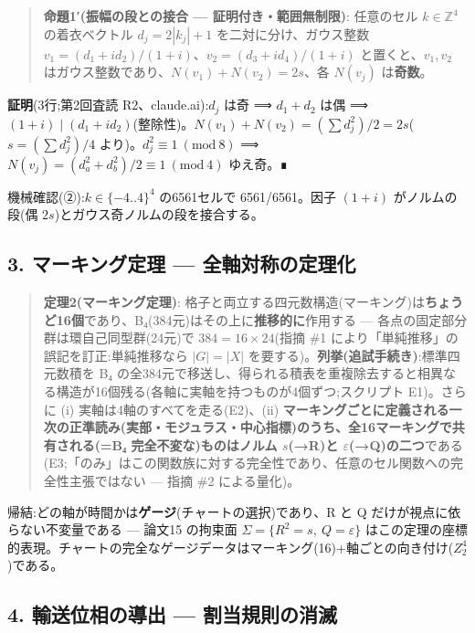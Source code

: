 \documentclass[
]{ltjsarticle}
\begin{document}
\begin{quote}
\textbf{命題1′(振幅の段との接合 --- 証明付き・範囲無制限)}: 任意のセル
\(k\in\mathbb{Z}^4\) の着衣ベクトル \(d_j=2|k_j|+1\)
を二対に分け、ガウス整数
\(v_1=(d_1+id_2)/(1+i)\)、\(v_2=(d_3+id_4)/(1+i)\) と置くと、\(v_1,v_2\)
はガウス整数であり、\(N(v_1)+N(v_2)=2s\)、各 \(N(v_j)\)
は\textbf{奇数}。
\end{quote}

\textbf{証明}(3行;第2回査読 R2、claude.ai):\(d_j\) は奇 ⟹ \(d_1+d_2\)
は偶 ⟹
\((1+i)\mid(d_1+id_2)\)(整除性)。\(N(v_1)+N(v_2)=(\sum d_j^2)/2=2s\)(\(s=(\sum d_j^2)/4\)
より)。\(d_j^2\equiv1\ (\mathrm{mod}\ 8)\) ⟹
\(N(v_j)=(d_a^2+d_b^2)/2\equiv1\ (\mathrm{mod}\ 4)\) ゆえ奇。∎

機械確認(②):\(k\in\{-4..4\}^4\) の6561セルで 6561/6561。因子 \((1+i)\)
がノルムの段(偶 \(2s\))とガウス奇ノルムの段を接合する。

\subsection{3. マーキング定理 ---
全軸対称の定理化}\label{ux30deux30fcux30adux30f3ux30b0ux5b9aux7406-ux5168ux8ef8ux5bfeux79f0ux306eux5b9aux7406ux5316}

\begin{quote}
\textbf{定理2(マーキング定理)}:
格子と両立する四元数構造(マーキング)は\textbf{ちょうど16個}であり、B₄(384元)はその上に\textbf{推移的に}作用する
--- 各点の固定部分群は環自己同型群(24元)で \(384=16\times24\)(指摘 \#1
により「単純推移」の誤記を訂正:単純推移なら \(|G|=|X|\)
を要する)。\textbf{列挙(追試手続き)}:標準四元数積を B₄
の全384元で移送し、得られる積表を重複除去すると相異なる構造が16個残る(各軸に実軸を持つものが4個ずつ;スクリプト
E1)。さらに (i) 実軸は4軸のすべてを走る(E2)、(ii)
\textbf{マーキングごとに定義される一次の正準読み(実部・モジュラス・中心指標)のうち、全16マーキングで共有される(=B₄
完全不変な)ものはノルム \(s\)(→R)と
\(\varepsilon\)(→Q)の二つ}である(E3;「のみ」はこの関数族に対する完全性であり、任意のセル関数への完全性主張ではない
--- 指摘 \#2 による量化)。
\end{quote}

帰結:どの軸が時間かは\textbf{ゲージ}(チャートの選択)であり、R と Q
だけが視点に依らない不変量である --- 論文15 の拘束面
\(\Sigma=\{R^2=s,\ Q=\varepsilon\}\)
はこの定理の座標的表現。チャートの完全なゲージデータはマーキング(16)+軸ごとの向き付け(\(Z_2^{4}\))である。

\subsection{4. 輸送位相の導出 ---
割当規則の消滅}\label{ux8f38ux9001ux4f4dux76f8ux306eux5c0eux51fa-ux5272ux5f53ux898fux5247ux306eux6d88ux6ec5}
\end{document}
